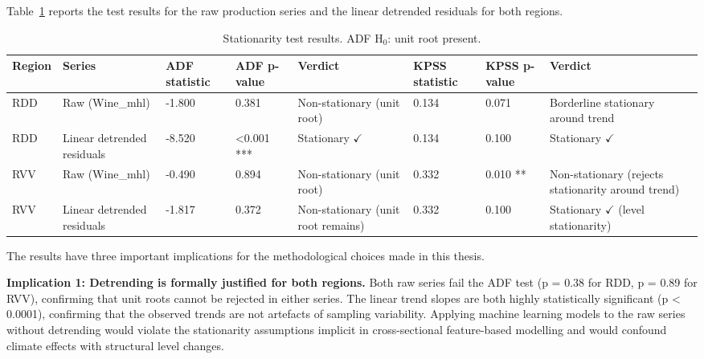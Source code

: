 Table~\ref{tab:ch3c_1} reports the test results for the raw production series and the linear detrended residuals for both regions.

\begin{table}[htbp]
  \centering
  \caption{Stationarity test results. ADF H$_0$: unit root present.}\label{tab:ch3c_1}
  \small
  \setlength{\tabcolsep}{4pt}
  \begin{adjustbox}{max width=\textwidth}
    \begin{tabularx}{\textwidth}{p{0.9cm}|p{2.2cm}|p{1.3cm}|p{1.3cm}|p{2cm}|p{1.3cm}|p{1.3cm}|X}
  \toprule
  Region & Series & ADF statistic & ADF p-value & Verdict & KPSS statistic & KPSS p-value & Verdict \\
  \midrule
  RDD & Raw (Wine\_mhl) & -1.800 & 0.381 & Non-stationary
(unit root) & 0.134 & 0.071 & Borderline stationary
around trend \\
  RDD & Linear detrended
residuals & -8.520 & <0.001 *** & Stationary $\checkmark$ & 0.134 & 0.100 & Stationary $\checkmark$ \\
  RVV & Raw (Wine\_mhl) & -0.490 & 0.894 & Non-stationary
(unit root) & 0.332 & 0.010 ** & Non-stationary
(rejects stationarity
around trend) \\
  RVV & Linear detrended
residuals & -1.817 & 0.372 & Non-stationary
(unit root remains) & 0.332 & 0.100 & Stationary $\checkmark$
(level stationarity) \\
  \bottomrule
\end{tabularx}
  \end{adjustbox}

\end{table}


The results have three important implications for the methodological choices made in this thesis.

\textbf{Implication 1: Detrending is formally justified for both regions. }Both raw series fail the ADF test (p = 0.38 for RDD, p = 0.89 for RVV), confirming that unit roots cannot be rejected in either series. The linear trend slopes are both highly statistically significant (p < 0.0001), confirming that the observed trends are not artefacts of sampling variability. Applying machine learning models to the raw series without detrending would violate the stationarity assumptions implicit in cross-sectional feature-based modelling and would confound climate effects with structural level changes.

